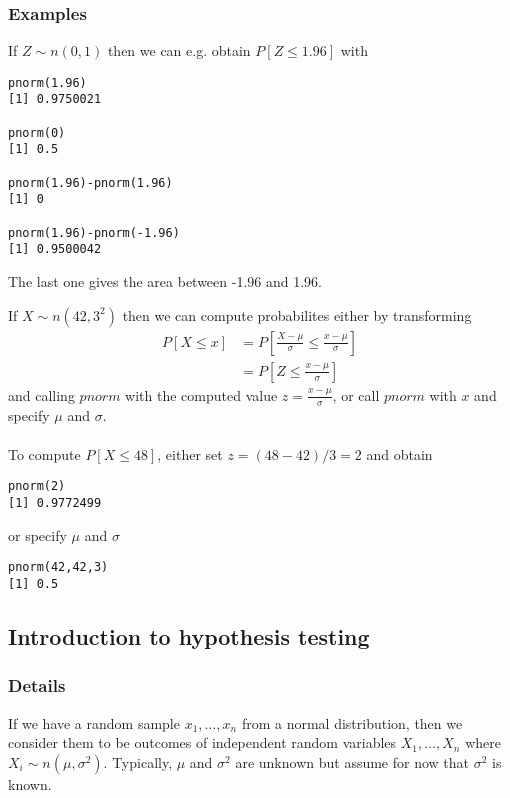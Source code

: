 \documentclass[12pt,a4paper]{article}
\theoremstyle{regla}
\theoremstyle{remark}
\theoremstyle{definition}
\theoremstyle{nonumberbreak}
\begin{document}
\subsubsection{Examples}
\begin{xmpl}
If $Z \sim n(0,1)$ then we can e.g. obtain $P[Z\leq1.96]$ with
\begin{lstlisting}
pnorm(1.96)
[1] 0.9750021

pnorm(0)
[1] 0.5

pnorm(1.96)-pnorm(1.96)
[1] 0

pnorm(1.96)-pnorm(-1.96)
[1] 0.9500042
\end{lstlisting}
The last one gives the area between -1.96 and 1.96.
\end{xmpl}
\begin{xmpl}
If $X \sim n(42,3^2)$ then we can compute probabilites either by transforming
\begin{align*}
P[X\leq x] &= P[\frac{X-\mu}{\sigma} \leq \frac{x-\mu}{\sigma}]\\
           &= P[Z \leq \frac{x-\mu}{\sigma}]
\end{align*}
and calling $pnorm$ with the computed value $z=\frac{x-\mu}{\sigma}$, or call $pnorm$ with $x$ and specify $\mu$ and $\sigma$.\\
\\
To compute $P[X\leq 48]$, either set $z=(48-42)/3=2$ and obtain
\begin{lstlisting}
pnorm(2)
[1] 0.9772499
\end{lstlisting}

or specify $\mu$ and $\sigma$

\begin{lstlisting}
pnorm(42,42,3)
[1] 0.5
\end{lstlisting}
\end{xmpl}



\subsection{Introduction to hypothesis testing}
\subsubsection{Details}
If we have a random sample $x_1, \ldots , x_n$ from a normal distribution, then we consider them to be outcomes of independent random variables $X_1, \ldots , X_n$ where $X_i \sim n(\mu, \sigma^2)$.
Typically, $\mu$ and $\sigma^2$ are unknown but assume for now that $\sigma^2$ is known.\\
\end{document}
